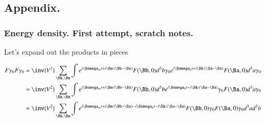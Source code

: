 
%
%




\chapter{}

%



\section{}

%


\section{Appendix. }
\subsection{Energy density.  First attempt, scratch notes. }

Let's expand out the products in pieces

\begin{align*}
F \gamma_0 F \gamma_0
&=
\inv{V^2} \sum_{\Bk,\Bm}
\int e^{i \Bomega_m t + i \Bm \cdot (\Bb-\Bx) } F(\Bb, 0) d^3 b \gamma_0
e^{i \Bomega_k t + i \Bk \cdot (\Ba-\Bx) } F(\Ba, 0) d^3 a \gamma_0 \\
&=
\inv{V^2} \sum_{\Bk,\Bm}
\int e^{i \Bomega_m t + i \Bm \cdot (\Bb-\Bx) } F(\Bb, 0) d^3 b
e^{i \Bomega_k t - i \Bk \cdot (\Ba-\Bx) } \gamma_0 F(\Ba, 0) d^3 a \gamma_0 \\
&=
\inv{V^2} \sum_{\Bk,\Bm}
\int e^{i \Bomega_m t + i \Bm \cdot (\Bb-\Bx) -i \Bomega_k t - i \Bk \cdot (\Ba-\Bx) } F(\Bb, 0) \gamma_0 F(\Ba, 0) \gamma_0 d^3 a d^3 b \\
\end{align*}

